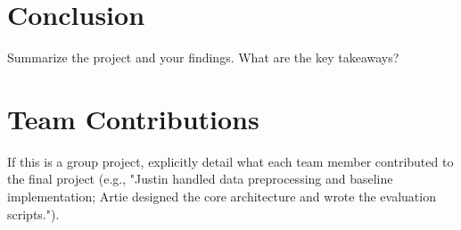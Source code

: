 \documentclass[11pt]{article}
\begin{document}
\section{Conclusion}
Summarize the project and your findings. What are the key takeaways? 

\section{Team Contributions}
If this is a group project, explicitly detail what each team member contributed to the final project (e.g., "Justin handled data preprocessing and baseline implementation; Artie designed the core architecture and wrote the evaluation scripts.").

 
 
\end{document}
